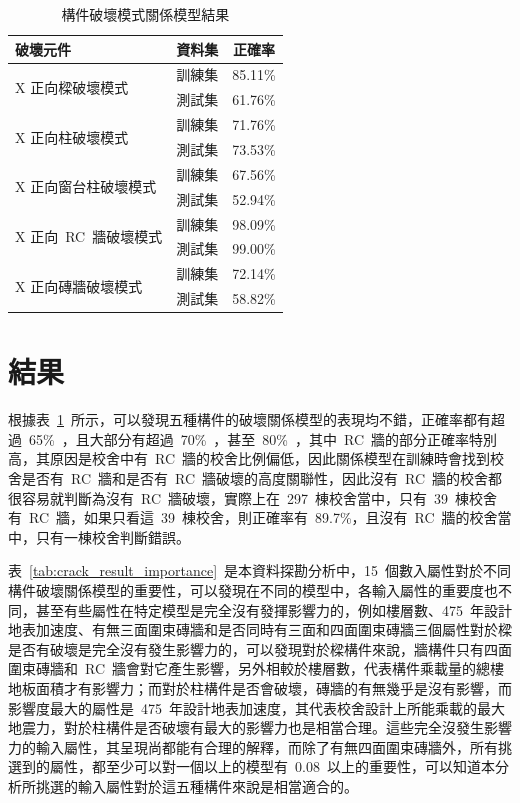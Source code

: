 

\setlength{\tabcolsep}{2em}
{\renewcommand{\arraystretch}{1.5}
\begin{table}[hbtp]
  \begin{center}
    \caption{構件破壞模式關係模型結果}
    \label{tab:comp_result}
    \begin{tabular}{l c c}
    	\hline
    	破壞元件 & 資料集 & 正確率 \\
    	\hline
    	\multirow{2}{*}{X 正向樑破壞模式} & 訓練集 & 85.11\% \\
    	\cline{2-3} & 測試集 & 61.76\% \\
    	\hline
    	\multirow{2}{*}{X 正向柱破壞模式} & 訓練集 & 71.76\% \\
    	\cline{2-3} & 測試集 & 73.53\% \\
    	\hline
    	\multirow{2}{*}{X 正向窗台柱破壞模式} & 訓練集 & 67.56\% \\
    	\cline{2-3} & 測試集 & 52.94\% \\
    	\hline
    	\multirow{2}{*}{X 正向~RC~牆破壞模式} & 訓練集 & 98.09\% \\
    	\cline{2-3} & 測試集 & 99.00\% \\
    	\hline
    	\multirow{2}{*}{X 正向磚牆破壞模式} & 訓練集 & 72.14\% \\
    	\cline{2-3} & 測試集 & 58.82\% \\
    	\hline
    \end{tabular}
  \end{center}
\end{table}
}

\section{結果}

根據表~\ref{tab:comp_result}~所示，可以發現五種構件的破壞關係模型的表現均不錯，正確率都有超過~65\%~，且大部分有超過~70\%~，甚至~80\%~，其中~RC~牆的部分正確率特別高，其原因是校舍中有~RC~牆的校舍比例偏低，因此關係模型在訓練時會找到校舍是否有~RC~牆和是否有~RC~牆破壞的高度關聯性，因此沒有~RC~牆的校舍都很容易就判斷為沒有~RC~牆破壞，實際上在~297~棟校舍當中，只有~39~棟校舍有~RC~牆，如果只看這~39~棟校舍，則正確率有~89.7\%，且沒有~RC~牆的校舍當中，只有一棟校舍判斷錯誤。

表~\ref{tab:crack_result_importance}~是本資料探勘分析中，15~個數入屬性對於不同構件破壞關係模型的重要性，可以發現在不同的模型中，各輸入屬性的重要度也不同，甚至有些屬性在特定模型是完全沒有發揮影響力的，例如樓層數、475~年設計地表加速度、有無三面圍束磚牆和是否同時有三面和四面圍束磚牆三個屬性對於樑是否有破壞是完全沒有發生影響力的，可以發現對於樑構件來說，牆構件只有四面圍束磚牆和~RC~牆會對它產生影響，另外相較於樓層數，代表構件乘載量的總樓地板面積才有影響力；而對於柱構件是否會破壞，磚牆的有無幾乎是沒有影響，而影響度最大的屬性是~475~年設計地表加速度，其代表校舍設計上所能乘載的最大地震力，對於柱構件是否破壞有最大的影響力也是相當合理。這些完全沒發生影響力的輸入屬性，其呈現尚都能有合理的解釋，而除了有無四面圍束磚牆外，所有挑選到的屬性，都至少可以對一個以上的模型有~0.08~以上的重要性，可以知道本分析所挑選的輸入屬性對於這五種構件來說是相當適合的。

